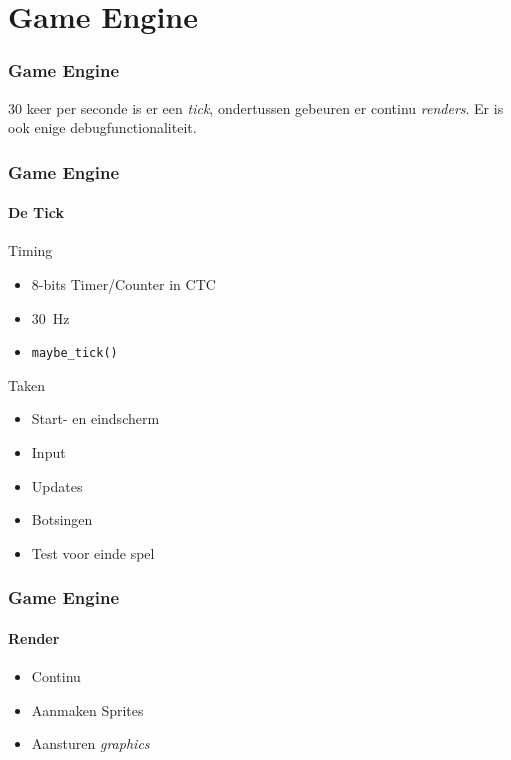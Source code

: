 \documentclass{beamer}
\begin{document}
\section{Game Engine}
\begin{frame}
  \frametitle{Game Engine}

  30 keer per seconde is er een \emph{tick}, ondertussen gebeuren er continu \emph{renders}.
  Er is ook enige debugfunctionaliteit.
\end{frame}

\begin{frame}
  \frametitle{Game Engine}
  \framesubtitle{De Tick}

  \begin{block}{Timing}
    \begin{itemize}
    \item 8-bits Timer/Counter in CTC
    \item \SI{30}{\hertz}
    \item \texttt{maybe_tick()}
    \end{itemize}
  \end{block}

  \begin{block}{Taken}
    \begin{itemize}
    \item Start- en eindscherm
    \item Input
    \item Updates
    \item Botsingen
    \item Test voor einde spel
    \end{itemize}
  \end{block}
\end{frame}

\begin{frame}
  \frametitle{Game Engine}
  \framesubtitle{Render}

  \begin{itemize}
  \item Continu
  \item Aanmaken Sprites
  \item Aansturen \emph{graphics}
  \end{itemize}
\end{frame}
\end{document}
